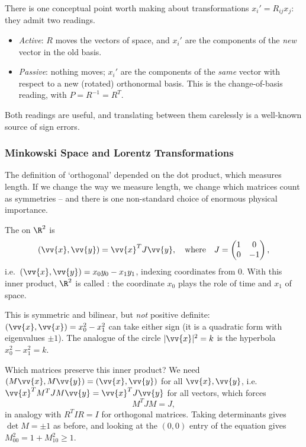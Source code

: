 There is one conceptual point worth making about transformations $x_i' = R_{ij}x_j$: they admit two readings.
\begin{itemize}
	\item \emph{Active}: $R$ moves the vectors of space, and $x_i'$ are the components of the \emph{new} vector in the old basis.
	\item \emph{Passive}: nothing moves; $x_i'$ are the components of the \emph{same} vector with respect to a new (rotated) orthonormal basis. This is the change-of-basis reading, with $P = R^{-1} = R^T$.
\end{itemize}
Both readings are useful, and translating between them carelessly is a well-known source of sign errors.

\subsubsection{Minkowski Space and Lorentz Transformations}

The definition of `orthogonal' depended on the dot product, which measures length. If we change the way we measure length, we change which matrices count as symmetries -- and there is one non-standard choice of enormous physical importance.

\begin{definition}
	The  on $\R^2$ is
	$$
	(\vv{x}, \vv{y}) = \vv{x}^T J \vv{y}, \quad \text{where} \quad J = \begin{pmatrix}
		1 & 0 \\ 0 & -1
	\end{pmatrix},
	$$
	i.e.\ $(\vv{x}, \vv{y}) = x_0 y_0 - x_1 y_1$, indexing coordinates from $0$. With this inner product, $\R^2$ is called : the coordinate $x_0$ plays the role of time and $x_1$ of space.
\end{definition}

This is symmetric and bilinear, but \emph{not} positive definite: $(\vv{x}, \vv{x}) = x_0^2 - x_1^2$ can take either sign (it is a quadratic form with eigenvalues $\pm 1$). The analogue of the circle $|\vv{x}|^2 = k$ is the hyperbola $x_0^2 - x_1^2 = k$.

Which matrices preserve this inner product? We need $(M\vv{x}, M\vv{y}) = (\vv{x}, \vv{y})$ for all $\vv{x}, \vv{y}$, i.e.\ $\vv{x}^T M^TJM\vv{y} = \vv{x}^TJ\vv{y}$ for all vectors, which forces
$$
M^TJM = J,
$$
in analogy with $R^TIR = I$ for orthogonal matrices. Taking determinants gives $\det M = \pm 1$ as before, and looking at the $(0,0)$ entry of the equation gives $M_{00}^2 = 1 + M_{10}^2 \geq 1$.

